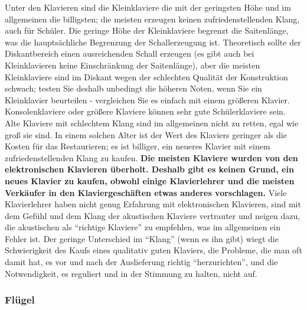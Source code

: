 Unter den Klavieren sind die Kleinklaviere die mit der geringsten Höhe und im allgemeinen die billigsten; die meisten erzeugen keinen zufriedenstellenden Klang, auch für Schüler.
Die geringe Höhe der Kleinklaviere begrenzt die Saitenlänge, was die hauptsächliche Begrenzung der Schallerzeugung ist.
Theoretisch sollte der Diskantbereich einen ausreichenden Schall erzeugen (es gibt auch bei Kleinklavieren keine Einschränkung der Saitenlänge), aber die meisten Kleinklaviere sind im Diskant wegen der schlechten Qualität der Konstruktion schwach; testen Sie deshalb unbedingt die höheren Noten, wenn Sie ein Kleinklavier beurteilen - vergleichen Sie es einfach mit einem größeren Klavier.
Konsolenklaviere oder größere Klaviere können sehr gute Schülerklaviere sein.
Alte Klaviere mit schlechtem Klang sind im allgemeinen nicht zu retten, egal wie groß sie sind.
In einem solchen Alter ist der Wert des Klaviers geringer als die Kosten für das Restaurieren; es ist billiger, ein neueres Klavier mit einem zufriedenstellenden Klang zu kaufen.
\textbf{Die meisten Klaviere wurden von den elektronischen Klavieren überholt.
Deshalb gibt es keinen Grund, ein neues Klavier zu kaufen, obwohl einige Klavierlehrer und die meisten Verkäufer in den Klaviergeschäften etwas anderes vorschlagen.}
Viele Klavierlehrer haben nicht genug Erfahrung mit elektronischen Klavieren, sind mit dem Gefühl und dem Klang der akustischen Klaviere vertrauter und neigen dazu, die akustischen als \enquote{richtige Klaviere} zu empfehlen, was im allgemeinen ein Fehler ist.
Der geringe Unterschied im \enquote{Klang} (wenn es ihn gibt) wiegt die Schwierigkeit des Kaufs eines qualitativ guten Klaviers, die Probleme, die man oft damit hat, es vor und nach der Auslieferung richtig \enquote{herzurichten}, und die Notwendigkeit, es reguliert und in der Stimmung zu halten, nicht auf.


\subsubsection{Flügel}
\label{c1iii17d}

